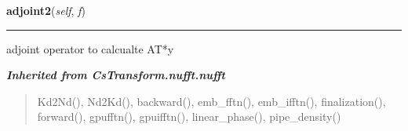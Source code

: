     \label{CsTransform:pynufft:pynufft:adjoint2}

    \vspace{0.5ex}

\hspace{.8\funcindent}\begin{boxedminipage}{\funcwidth}

    \raggedright \textbf{adjoint2}(\textit{self}, \textit{f})

    \vspace{-1.5ex}

    \rule{\textwidth}{0.5\fboxrule}
\setlength{\parskip}{2ex}
    adjoint operator to calcualte AT*y

\setlength{\parskip}{1ex}
    \end{boxedminipage}


\large{\textbf{\textit{Inherited from CsTransform.nufft.nufft}}}

\begin{quote}
Kd2Nd(), Nd2Kd(), backward(), emb\_fftn(), emb\_ifftn(), finalization(), forward(), gpufftn(), gpuifftn(), linear\_phase(), pipe\_density()
\end{quote}
